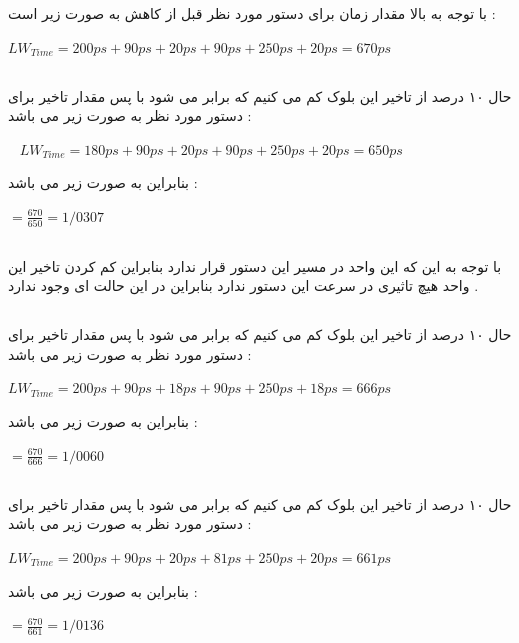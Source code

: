 با توجه به بالا مقدار زمان برای دستور مورد نظر قبل از کاهش به صورت زیر است  : 
\begin{center}
	$LW _{Time} = 200ps + 90ps + 20ps + 90ps + 250ps + 20ps = 670ps$
\end{center}

\subsection*{} 
حال ۱۰ درصد از تاخیر این بلوک کم می کنیم که برابر می شود با  
\textcolor{red}{}
پس مقدار تاخیر برای دستور مورد نظر به صورت زیر می باشد  : 
 \begin{center}
 	$LW _{Time} = 180ps + 90ps + 20ps + 90ps + 250ps + 20ps = 650ps$
 \end{center}
بنابراین 
به صورت زیر می باشد  : 
\begin{center}

	$ = \frac{670}{650} = 1/0307 $	
\end{center}

\subsection*{}
با توجه به این که این واحد در مسیر این دستور قرار ندارد بنابراین کم کردن تاخیر این واحد  هیچ تاثیری در سرعت این دستور ندارد بنابراین در این حالت 
ای وجود ندارد . 
\subsection*{}
حال ۱۰ درصد از تاخیر این بلوک کم می کنیم که برابر می شود با  
\textcolor{red}{}
پس مقدار تاخیر برای دستور مورد نظر به صورت زیر می باشد  :
 \begin{center}
	$LW _{Time} = 200ps + 90ps + 18ps + 90ps + 250ps + 18ps = 666ps$
\end{center}
بنابراین 
به صورت زیر می باشد  : 
\begin{center}
	
	$ = \frac{670}{666} = 1/0060 $	
\end{center}
\subsection*{}
حال ۱۰ درصد از تاخیر این بلوک کم می کنیم که برابر می شود با  
\textcolor{red}{}
پس مقدار تاخیر برای دستور مورد نظر به صورت زیر می باشد  :
\begin{center}
	$LW _{Time} = 200ps + 90ps + 20ps + 81ps + 250ps + 20ps = 661ps$
\end{center}
بنابراین 
به صورت زیر می باشد  : 
\begin{center}
	
	$ = \frac{670}{661} = 1/0136 $	
\end{center}
